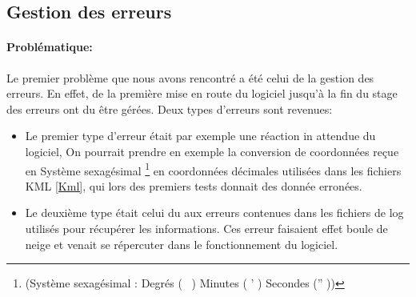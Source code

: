     \subsection{Gestion des erreurs}
            \paragraph{Problématique:}
Le premier problème que nous avons rencontré a été celui de la gestion des erreurs. En effet, de la première mise en route du logiciel jusqu'à la fin du stage des erreurs ont du être gérées. Deux types d'erreurs sont revenues:
\begin{itemize}
    \item Le premier type d'erreur était par exemple une réaction in attendue du logiciel, On pourrait prendre en exemple la conversion de coordonnées reçue en Système sexagésimal \footnote{(Système sexagésimal : Degrés ( \degres\ ) Minutes ( ' ) Secondes ('' ))} en coordonnées décimales utilisées dans les fichiers KML \vref{Kml}, qui lors des premiers tests donnait des donnée erronées.
    \item Le deuxième type était celui du aux erreurs contenues dans les fichiers de log utilisés pour récupérer les informations. Ces erreur faisaient effet boule de neige et venait se répercuter dans le fonctionnement du logiciel.
\end{itemize}\medskip

